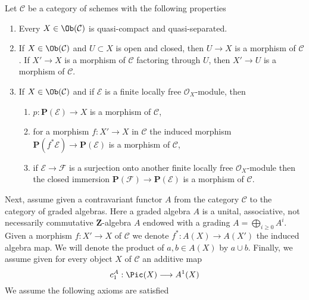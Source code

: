 \medskip\noindent
Let $\mathcal{C}$ be a category of schemes with the following properties
\begin{enumerate}
\item Every $X \in \Ob(\mathcal{C})$ is quasi-compact and quasi-separated.
\item If $X \in \Ob(\mathcal{C})$ and $U \subset X$ is open and closed,
then $U \to X$ is a morphism of $\mathcal{C}$. If $X' \to X$ is a morphism
of $\mathcal{C}$ factoring through $U$, then $X' \to U$ is a morphism
of $\mathcal{C}$.
\item If $X \in \Ob(\mathcal{C})$ and if $\mathcal{E}$ is a finite
locally free $\mathcal{O}_X$-module, then
\begin{enumerate}
\item $p : \mathbf{P}(\mathcal{E}) \to X$ is a morphism of $\mathcal{C}$,
\item for a morphism $f : X' \to X$ in $\mathcal{C}$ the
induced morphism $\mathbf{P}(f^*\mathcal{E}) \to \mathbf{P}(\mathcal{E})$
is a morphism of $\mathcal{C}$,
\item if $\mathcal{E} \to \mathcal{F}$ is a surjection onto another finite
locally free $\mathcal{O}_X$-module then the closed immersion
$\mathbf{P}(\mathcal{F}) \to \mathbf{P}(\mathcal{E})$
is a morphism of $\mathcal{C}$.
\end{enumerate}
\end{enumerate}
Next, assume given a contravariant functor $A$ from the
category $\mathcal{C}$ to the category of graded algebras.
Here a graded algebra $A$ is a unital, associative,
not necessarily commutative $\mathbf{Z}$-algebra $A$ endowed with a grading
$A = \bigoplus_{i \geq 0} A^i$. Given a morphism
$f : X' \to X$ of $\mathcal{C}$ we denote $f^* : A(X) \to A(X')$ the
induced algebra map.
We will denote the product of $a, b \in A(X)$ by $a \cup b$.
Finally, we assume
given for every object $X$ of $\mathcal{C}$ an additive  map
$$
c_1^A : \Pic(X) \longrightarrow A^1(X)
$$
We assume the following axioms are satisfied
